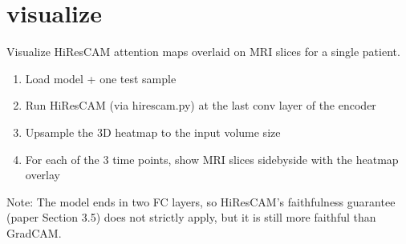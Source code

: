 \documentclass[letterpaper,10pt,english]{sphinxmanual}
\begin{document}
\sphinxstepscope


\section{visualize}
\label{\detokenize{visualize:module-visualize}}\label{\detokenize{visualize:visualize}}\label{\detokenize{visualize::doc}}
\sphinxAtStartPar
Visualize HiResCAM attention maps overlaid on MRI slices for a single patient.
\begin{description}
\begin{enumerate}
%
\item {} 
\sphinxAtStartPar
Load model + one test sample

\item {} 
\sphinxAtStartPar
Run HiResCAM (via hirescam.py) at the last conv layer of the encoder

\item {} 
\sphinxAtStartPar
Upsample the 3D heatmap to the input volume size

\item {} 
\sphinxAtStartPar
For each of the 3 time points, show MRI slices side\sphinxhyphen{}by\sphinxhyphen{}side with the heatmap overlay

\end{enumerate}

\end{description}

\sphinxAtStartPar
Note: The model ends in two FC layers, so HiResCAM’s faithfulness guarantee
(paper Section 3.5) does not strictly apply, but it is still more faithful than Grad\sphinxhyphen{}CAM.

\begin{fulllineitems}
\label{\detokenize{visualize:visualize.load_model}}
\pysigstartsignatures
\pysiglinewithargsret
{}
{}
{}
\pysigstopsignatures
\end{fulllineitems}


\begin{fulllineitems}
\label{\detokenize{visualize:visualize.main}}
\pysigstartsignatures
\pysiglinewithargsret
{}
{}
{}
\pysigstopsignatures
\end{fulllineitems}
\end{document}
